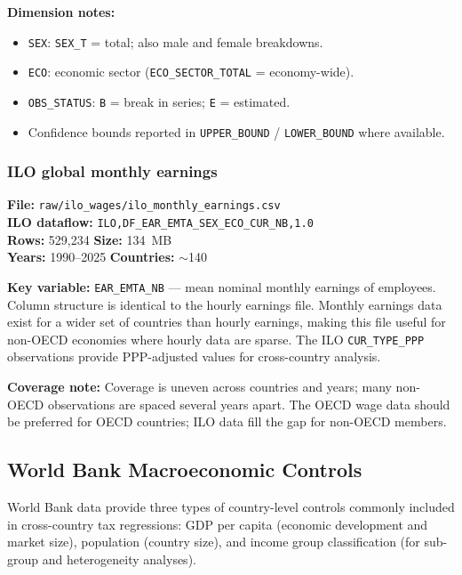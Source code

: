 \documentclass[11pt,a4paper]{article}
\newcommand{\code}[1]{\texttt{#1}}
\begin{document}
\noindent\textbf{Dimension notes:}
\begin{itemize}[noitemsep]
    \item \texttt{SEX}: \texttt{SEX\_T} = total; also male and female breakdowns.
    \item \texttt{ECO}: economic sector (\texttt{ECO\_SECTOR\_TOTAL} = economy-wide).
    \item \texttt{OBS\_STATUS}: \texttt{B} = break in series; \texttt{E} = estimated.
    \item Confidence bounds reported in \texttt{UPPER\_BOUND} / \texttt{LOWER\_BOUND} where available.
\end{itemize}

\subsubsection{ILO global monthly earnings}

\textbf{File:} \texttt{raw/ilo\_wages/ilo\_monthly\_earnings.csv}\\
\textbf{ILO dataflow:} \texttt{ILO,DF\_EAR\_EMTA\_SEX\_ECO\_CUR\_NB,1.0}\\
\textbf{Rows:} 529{,}234 \quad \textbf{Size:} 134~MB\\
\textbf{Years:} 1990--2025 \quad \textbf{Countries:} $\sim$140

\noindent\textbf{Key variable:} \code{EAR\_EMTA\_NB} --- mean nominal monthly earnings of employees.  Column structure is identical to the hourly earnings file.  Monthly earnings data exist for a wider set of countries than hourly earnings, making this file useful for non-OECD economies where hourly data are sparse.  The ILO \texttt{CUR\_TYPE\_PPP} observations provide PPP-adjusted values for cross-country analysis.

\noindent\textbf{Coverage note:} Coverage is uneven across countries and years; many non-OECD observations are spaced several years apart.  The OECD wage data should be preferred for OECD countries; ILO data fill the gap for non-OECD members.


\subsection{World Bank Macroeconomic Controls}\label{sec:worldbank}

World Bank data provide three types of country-level controls commonly included in cross-country tax regressions: GDP per capita (economic development and market size), population (country size), and income group classification (for sub-group and heterogeneity analyses).
\end{document}
